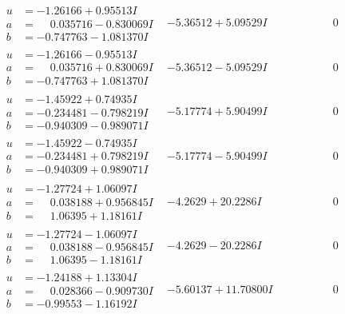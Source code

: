 \documentclass[1p]{elsarticle_modified}
\theoremstyle{definition}
\begin{document}
$$\begin{array}{c|c|c}
\begin{aligned}
u &= -1.26166 + 0.95513 I \\
a &= \phantom{-}0.035716 - 0.830069 I \\
b &= -0.747763 - 1.081370 I\end{aligned}
 & -5.36512 + 5.09529 I & \phantom{-0.000000 } 0 \\ \hline\begin{aligned}
u &= -1.26166 - 0.95513 I \\
a &= \phantom{-}0.035716 + 0.830069 I \\
b &= -0.747763 + 1.081370 I\end{aligned}
 & -5.36512 - 5.09529 I & \phantom{-0.000000 } 0 \\ \hline\begin{aligned}
u &= -1.45922 + 0.74935 I \\
a &= -0.234481 - 0.798219 I \\
b &= -0.940309 - 0.989071 I\end{aligned}
 & -5.17774 + 5.90499 I & \phantom{-0.000000 } 0 \\ \hline\begin{aligned}
u &= -1.45922 - 0.74935 I \\
a &= -0.234481 + 0.798219 I \\
b &= -0.940309 + 0.989071 I\end{aligned}
 & -5.17774 - 5.90499 I & \phantom{-0.000000 } 0 \\ \hline\begin{aligned}
u &= -1.27724 + 1.06097 I \\
a &= \phantom{-}0.038188 + 0.956845 I \\
b &= \phantom{-}1.06395 + 1.18161 I\end{aligned}
 & -4.2629 + 20.2286 I & \phantom{-0.000000 } 0 \\ \hline\begin{aligned}
u &= -1.27724 - 1.06097 I \\
a &= \phantom{-}0.038188 - 0.956845 I \\
b &= \phantom{-}1.06395 - 1.18161 I\end{aligned}
 & -4.2629 - 20.2286 I & \phantom{-0.000000 } 0 \\ \hline\begin{aligned}
u &= -1.24188 + 1.13304 I \\
a &= \phantom{-}0.028366 - 0.909730 I \\
b &= -0.99553 - 1.16192 I\end{aligned}
 & -5.60137 + 11.70800 I & \phantom{-0.000000 } 0 \\ \hline\begin{aligned}

\end{aligned}
\end{array}$$
\end{document}
